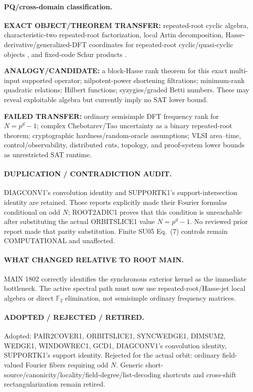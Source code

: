 \documentclass[11pt]{article}
\begin{document}
\paragraph{PQ/cross-domain classification.}
\textbf{EXACT OBJECT/THEOREM TRANSFER:} repeated-root cyclic algebra, characteristic-two repeated-root factorization, local Artin decomposition, Hasse-derivative/generalized-DFT coordinates for repeated-root cyclic/quasi-cyclic objects \cite{LingNiederreiterSole,GenMS}, and fixed-code Schur products \cite{Rand}.

\textbf{ANALOGY/CANDIDATE:} a block-Hasse rank theorem for this exact multi-input supported operator; nilpotent-power shortening filtrations; minimum-rank quadratic relations; Hilbert functions; syzygies/graded Betti numbers. These may reveal exploitable algebra but currently imply no SAT lower bound.

\textbf{FAILED TRANSFER:} ordinary semisimple DFT frequency rank for \(N=p^d-1\); complex Chebotarev/Tao uncertainty as a binary repeated-root theorem; cryptographic hardness/random-oracle assumptions; VLSI area--time, control/observability, distributed cuts, topology, and proof-system lower bounds as unrestricted SAT runtime.

\paragraph{DUPLICATION / CONTRADICTION AUDIT.}
DIAGCONV1's convolution identity and SUPPORTK1's support-intersection identity are retained. Those reports explicitly made their Fourier formulas conditional on odd \(N\); ROOT2ADIC1 proves that this condition is unreachable after substituting the actual ORBITSLICE1 value \(N=p^d-1\). No reviewed prior report made that parity substitution. Finite SU05 Eq.~(7) controls remain COMPUTATIONAL and unaffected.

\paragraph{WHAT CHANGED RELATIVE TO ROOT MAIN.}
MAIN 1802 correctly identifies the synchronous exterior kernel as the immediate bottleneck. The active spectral path must now use repeated-root/Hasse-jet local algebra or direct \(\mathbb F_2\) elimination, not semisimple ordinary frequency matrices.

\paragraph{ADOPTED / REJECTED / RETIRED.}
Adopted: PAIR2COVER1, ORBITSLICE1, SYNCWEDGE1, DIMSUM2, WEDGE1, WINDOWREC1, GCD1, DIAGCONV1's convolution identity, SUPPORTK1's support identity.
Rejected for the actual orbit: ordinary field-valued Fourier fibers requiring odd \(N\).
Generic short-source/canonicity/locality/field-degree/list-decoding shortcuts and cross-shift rectangularization remain retired.
\end{document}

